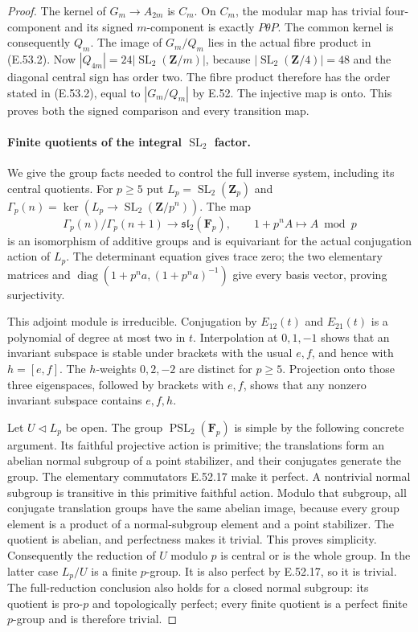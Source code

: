 \begin{proof}
The kernel of $G_m\to A_{2m}$ is $C_m$.
On $C_m$, the modular map has trivial four-component
and its signed $m$-component is exactly $P\theta P$.
The common kernel is consequently $Q_m$.
The image of $G_m/Q_m$ lies in the actual fibre
product in \textup{(E.53.2)}.
Now $|Q_{4m}|=24|\operatorname{SL}_2(\mathbf Z/m)|$,
because $|\operatorname{SL}_2(\mathbf Z/4)|=48$ and
the diagonal central sign has order two.
The fibre product therefore has the order stated in
\textup{(E.53.2)}, equal to $|G_m/Q_m|$ by E.52.
The injective map is onto. This proves both the
signed comparison and every transition map.

\paragraph{Finite quotients of the integral $\operatorname{SL}_2$ factor.}
We give the group facts needed to control the full
inverse system, including its central quotients.
For $p\geq5$ put
$L_p=\operatorname{SL}_2(\mathbf Z_p)$ and
$\Gamma_p(n)=\ker(L_p\to\operatorname{SL}_2(\mathbf Z/p^n))$.
The map
\[
 \Gamma_p(n)/\Gamma_p(n+1)\longrightarrow\mathfrak{sl}_2(\mathbf F_p),
              \qquad 1+p^n A\longmapsto A\bmod p
 \tag{E.53.8}
\]
is an isomorphism of additive groups and is equivariant
for the actual conjugation action of $L_p$.
The determinant equation gives trace zero; the two
elementary matrices and $\operatorname{diag}(1+p^na,(1+p^na)^{-1})$
give every basis vector, proving surjectivity.

This adjoint module is irreducible.
Conjugation by $E_{12}(t)$ and $E_{21}(t)$ is a
polynomial of degree at most two in $t$.
Interpolation at $0,1,-1$ shows that an invariant
subspace is stable under brackets with the usual
$e,f$, and hence with $h=[e,f]$.
The $h$-weights $0,2,-2$ are distinct for $p\geq5$.
Projection onto those three eigenspaces, followed
by brackets with $e,f$, shows that any nonzero
invariant subspace contains $e,f,h$.

Let $U\triangleleft L_p$ be open.
The group $\operatorname{PSL}_2(\mathbf F_p)$ is simple
by the following concrete argument. Its faithful
projective action is primitive; the translations form
an abelian normal subgroup of a point stabilizer,
and their conjugates generate the group. The elementary
commutators E.52.17 make it perfect.
A nontrivial normal subgroup is transitive in this
primitive faithful action. Modulo that subgroup,
all conjugate translation groups have the same
abelian image, because every group element is a
product of a normal-subgroup element and a point
stabilizer. The quotient is abelian, and perfectness
makes it trivial. This proves simplicity.
Consequently the reduction of $U$ modulo $p$ is
central or is the whole group. In the latter case
$L_p/U$ is a finite $p$-group. It is also perfect
by E.52.17, so it is trivial.
The full-reduction conclusion also holds for a closed normal
subgroup: its quotient is pro-$p$ and topologically perfect;
every finite quotient is a perfect finite $p$-group and is
therefore trivial.


\end{proof}
